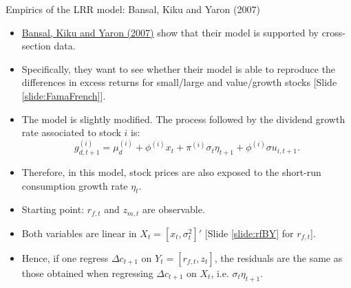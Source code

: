 \begin{frame}{Empirics of the LRR model: Bansal, Kiku and Yaron (2007)}
\begin{footnotesize}
\begin{itemize}
	\item \href{https://faculty.fuqua.duke.edu/~rb7/bio/BKY_09252007.pdf}{Bansal, Kiku and Yaron (2007)} show that their model is supported by cross-section data.
	\item Specifically, they want to see whether their model is able to reproduce the differences in excess returns for small/large and value/growth stocks [Slide \ref{slide:FamaFrench}].
	\item The model is slightly modified. The process followed by the dividend growth rate associated to stock $i$ is:
	$$
	g^{(i)}_{d,t+1} = \mu_d^{(i)} + \phi^{(i)} x_t + \pi^{(i)}\sigma_t \eta_{t+1} +  \phi^{(i)} \sigma u_{i,t+1}.
	$$
	\item Therefore, in this model, stock prices are also exposed to the short-run consumption growth rate $\eta_t$.
	
	\vspace{.3cm}
	\item Starting point: $r_{f,t}$ and $z_{m,t}$ are observable.
	\item Both variables are linear in $X_t=[x_t,\sigma_t^2]'$ [Slide \ref{slide:rfBY} for $r_{f,t}$].
	\item Hence, if one regress $\Delta c_{t+1}$ on $Y_t=[r_{f,t},z_t]$, the residuals are the same as those obtained when regressing $\Delta c_{t+1}$ on $X_t$, i.e. $\sigma_t \eta_{t+1}$.

\end{itemize}
\end{footnotesize}
\end{frame}


